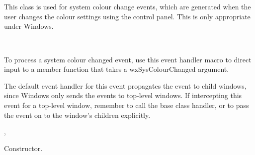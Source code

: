 \section{}\label{wxsyscolourchangedevent}

This class is used for system colour change events, which are generated
when the user changes the colour settings using the control panel.
This is only appropriate under Windows.


\\


To process a system colour changed event, use this event handler macro to direct input to a member
function that takes a wxSysColourChanged argument.

\twocolwidtha{7cm}
\begin{twocollist}\itemsep=0pt
\end{twocollist}%


The default event handler for this event propagates the event to child windows, since
Windows only sends the events to top-level windows. If
intercepting this event for a top-level window, remember to call the base class handler,
or to pass the event on to the window's children explicitly.


, 




Constructor.

